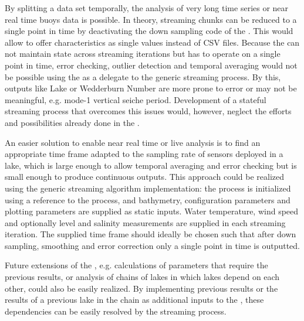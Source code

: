   By splitting a data set temporally, the analysis of very long time series or near real time buoys data is possible. In theory, streaming chunks can be reduced to a single point in time by deactivating the down sampling code of the \la. This would allow to offer characteristics as single values instead of \ac{CSV} files. Because the \la can not maintain state across streaming iterations but has to operate on a single point in time, error checking, outlier detection and temporal averaging would not be possible using the \la as a delegate to the generic streaming process. By this, outputs like Lake or Wedderburn Number are more prone to error or may not be meaningful, e.g. mode-1 vertical seiche period. Development of a stateful streaming process that overcomes this issues would, however, neglect the efforts and possibilities already done in the \la.

  An easier solution to enable near real time or live analysis is to find an appropriate time frame adapted to the sampling rate of sensors deployed in a lake, which is large enough to allow temporal averaging and error checking but is small enough to produce continuous outputs. This approach could be realized using the generic streaming algorithm implementation: the process is initialized using a reference to the \la process, and bathymetry, configuration parameters and plotting parameters are supplied as static inputs. Water temperature, wind speed and optionally level and salinity measurements are supplied in each streaming iteration. The supplied time frame should ideally be chosen such that after down sampling, smoothing and error correction only a single point in time is outputted.

  Future extensions of the \la, e.g. calculations of parameters that require the previous results, or analysis of chains of lakes in which lakes depend on each other, could also be easily realized. By implementing previous results or the results of a previous lake in the chain as additional inputs to the \la, these dependencies can be easily resolved by the streaming process.